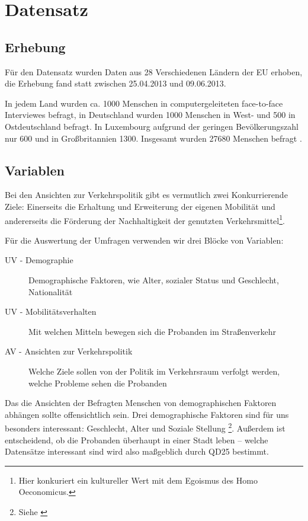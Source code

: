 \section{Datensatz}

\nocite{eb794}
\subsection{Erhebung}

Für den Datensatz wurden Daten aus 28 Verschiedenen Ländern der EU erhoben, die Erhebung fand statt zwischen 25.04.2013 und 09.06.2013.

In jedem Land wurden ca. 1000 Menschen in computergeleiteten face-to-face Interviewes befragt, in Deutschland wurden 1000 Menschen in West- und 500 in Ostdeutschland befragt. In Luxembourg aufgrund der geringen Bevölkerungszahl nur 600 und in Großbritannien 1300. Insgesamt wurden 27680 Menschen befragt \parencite{eceuropaeu}.

\subsection{Variablen}

Bei den Ansichten zur Verkehrspolitik gibt es vermutlich zwei Konkurrierende Ziele: Einerseits die Erhaltung und Erweiterung der eigenen Mobilität und andererseits die Förderung der Nachhaltigkeit der genutzten Verkehrsmittel\footnote{Hier konkuriert ein kultureller Wert mit dem Egoismus des Homo Oeconomicus.}.

Für die Auswertung der Umfragen verwenden wir drei Blöcke von Variablen:
\begin{description}
	\item[UV - Demographie] Demographische Faktoren, wie Alter, sozialer Status und Geschlecht, Nationalität
	\item[UV - Mobilitätsverhalten] Mit welchen Mitteln bewegen sich die Probanden im Straßenverkehr
	\item[AV - Ansichten zur Verkehrspolitik] Welche Ziele sollen von der Politik im Verkehrsraum verfolgt werden, welche Probleme sehen die Probanden
\end{description}
Das die Ansichten der Befragten Menschen von demographischen Faktoren abhängen sollte offensichtlich sein.
Drei demographische Faktoren sind für uns besonders interessant: Geschlecht, Alter und Soziale Stellung \footnote{Siehe \cite[33 ff.]{widmer}}.
Außerdem ist entscheidend, ob die Probanden überhaupt in einer Stadt leben – welche Datensätze interessant sind wird also maßgeblich durch QD25 bestimmt.

